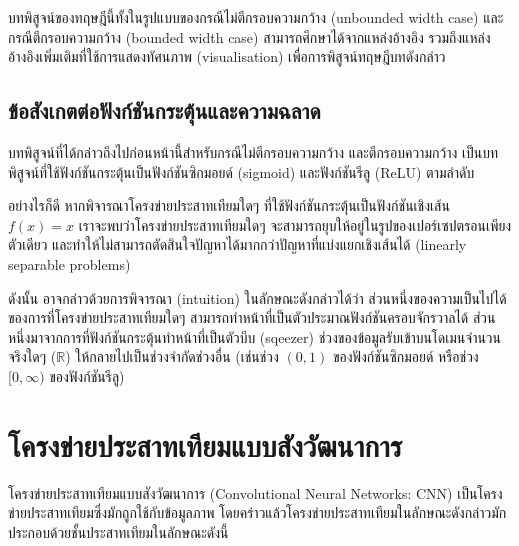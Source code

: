 \documentclass{cpereport}
\begin{document}
บทพิสูจน์ของทฤษฎีนี้ทั้งในรูปแบบของกรณีไม่ตีกรอบความกว้าง (unbounded width case) และกรณีตีกรอบความกว้าง (bounded width case) สามารถศึกษาได้จากแหล่งอ้างอิง รวมถึงแหล่งอ้างอิงเพิ่มเติมที่ใช้การแสดงทัศนภาพ (visualisation) เพื่อการพิสูจน์ทฤษฎีบทดังกล่าว \cite{nielsen_1970}

\subsection{ข้อสังเกตต่อฟังก์ชันกระตุ้นและความฉลาด}

บทพิสูจน์ที่ได้กล่าวถึงไปก่อนหน้านี้สำหรับกรณีไม่ตีกรอบความกว้าง และตีกรอบความกว้าง เป็นบทพิสูจน์ที่ใช้ฟังก์ชันกระตุ้นเป็นฟังก์ชันซิกมอยด์ (sigmoid) และฟังก์ชันรีลู (ReLU) ตามลำดับ

อย่างไรก็ดี หากพิจารณาโครงข่ายประสาทเทียมใดๆ ที่ใช้ฟังก์ชันกระตุ้นเป็นฟังก์ชันเชิงเส้น $f(x) = x$ เราจะพบว่าโครงข่ายประสาทเทียมใดๆ จะสามารถยุบให้อยู่ในรูปของเปอร์เซปตรอนเพียงตัวเดียว และทำให้ไม่สามารถตัดสินใจปัญหาได้มากกว่าปัญหาที่แบ่งแยกเชิงเส้นได้ (linearly separable problems)

ดังนั้น อาจกล่าวด้วยการพิจารณา (intuition) ในลักษณะดังกล่าวได้ว่า ส่วนหนึ่งของความเป็นไปได้ของการที่โครงข่ายประสาทเทียมใดๆ สามารถทำหน้าที่เป็นตัวประมาณฟังก์ชันครอบจักรวาลได้ ส่วนหนึ่งมาจากการที่ฟังก์ชันกระตุ้นทำหน้าที่เป็นตัวบีบ (sqeezer) ช่วงของข้อมูลรับเข้าบนโดเมนจำนวนจริงใดๆ ($\mathbb{R}$) ให้กลายไปเป็นช่วงจำกัดช่วงอื่น (เช่นช่วง $(0, 1)$ ของฟังก์ชันซิกมอยด์ หรือช่วง $[0, \infty)$ ของฟังก์ชันรีลู)

\section{โครงข่ายประสาทเทียมแบบสังวัฒนาการ}

โครงข่ายประสาทเทียมแบบสังวัฒนาการ (Convolutional Neural Networks: CNN) \cite{lecun-1998} เป็นโครงข่ายประสาทเทียมซึ่งมักถูกใช้กับข้อมูลภาพ \cite{Krizhevsky-2012} โดยคร่าวแล้วโครงข่ายประสาทเทียมในลักษณะดังกล่าวมักประกอบด้วยชั้นประสาทเทียมในลักษณะดังนี้
\end{document}
